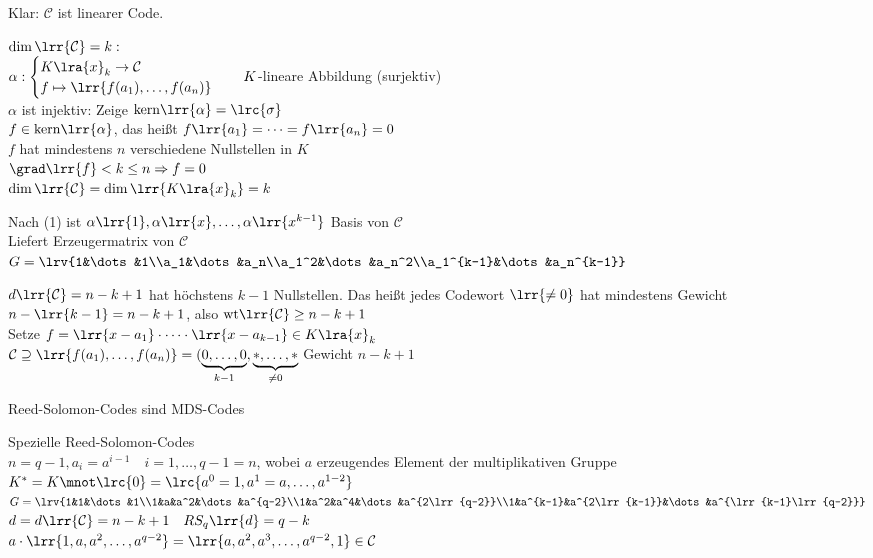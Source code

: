 			Klar: $\mathcal{C}$ ist linearer Code.
			
				\item $\dim\lrr{\mathcal{C}}=k:$\\
					$\alpha:\begin{cases}K\lra{x}_k\rightarrow\mathcal{C}\\f\mapsto\lrr{f(a_1),\dots,f(a_n)}\end{cases}\quad K$-lineare Abbildung (surjektiv)\\
					$\alpha$ ist injektiv: Zeige $\mbox{kern}\lrr{\alpha}=\lrc{\sigma}$\\
					$f\in\mbox{kern}\lrr{\alpha}$, das heißt $f\lrr{a_1}=\dots=f\lrr{a_n}=0$\\
					$f$ hat mindestens $n$ verschiedene Nullstellen in $K$\\
					$\grad\lrr{f}<k\leq n\Rightarrow f=0$\\
					$\dim\lrr{\mathcal{C}}=\dim\lrr{K\lra{x}_k}=k$
				\item Nach (1) ist $\alpha\lrr{1},\alpha\lrr{x},\dots,\alpha\lrr{x^{k-1}}$ Basis von $\mathcal{C}$\\
					Liefert Erzeugermatrix von $\mathcal{C}$\\
					$G=\lrv{1&\dots&1\\a_1&\dots&a_n\\a_1^2&\dots&a_n^2\\a_1^{k-1}&\dots&a_n^{k-1}}$
				\item $d\lrr{\mathcal{C}}=n-k+1$ hat höchstens $k-1$ Nullstellen. Das heißt jedes Codewort $\lrr{\neq 0}$ hat mindestens Gewicht $n-\lrr{k-1}=n-k+1$, also $\mbox{wt}\lrr{\mathcal{C}}\geq n-k+1$\\
					Setze $f=\lrr{x-a_1}\cdot\dots\cdot\lrr{x-a_{k-1}}\in K\lra{x}_k$\\
					$\mathcal{C}\supseteq\lrr{f(a_1),\dots,f(a_n)}=(\underbrace{0,\dots,0}_{k-1},\underbrace{*,\dots,*}_{\neq 0}$ Gewicht $n-k+1$
				\item Reed-Solomon-Codes sind MDS-Codes
			\subExEnd
		\item Spezielle Reed-Solomon-Codes\\
			$n=q-1, a_i=a^{i-1}\quad i=1,\dots, q-1=n$, wobei $a$ erzeugendes Element der multiplikativen Gruppe $K^*=K\mnot\lrc{0}=\lrc{a^0=1,a^1=a,\dots,a^{1-2}}$\\
			$G=\lrv{1&1&\dots&1\\1&a&a^2&\dots&a^{q-2}\\1&a^2&a^4&\dots&a^{2\lrr{q-2}}\\1&a^{k-1}&a^{2\lrr{k-1}}&\dots&a^{\lrr{k-1}\lrr{q-2}}}$\\
			$d=d\lrr{\mathcal{C}}=n-k+1\quad RS_q\lrr{d}=q-k$\\
			$a\cdot\lrr{1,a,a^2,\dots, a^{q-2}}=\lrr{a,a^2,a^3,\dots,a^{q-2},1}\in\mathcal{C}$
			
